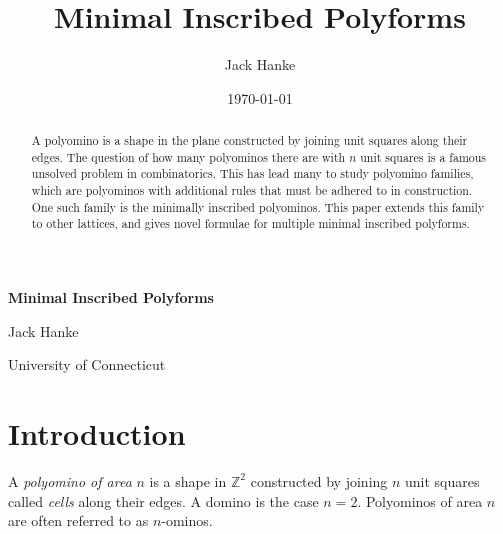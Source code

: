 \documentclass[12pt]{article}
\title{Minimal Inscribed Polyforms}
\author{Jack Hanke}
\date{\today}
\theoremstyle{plain}
\theoremstyle{definition}
\theoremstyle{remark}
\theoremstyle{definition}
\newcommand{\cell}[4]{\filldraw[gray!40] ( #1 , #2 ) rectangle ( #3 , #4 ); \draw[thick] ( #1 , #2 ) rectangle ( #3 , #4 );}
\begin{document}
\begin{center}
    \Large
    \textbf{Minimal Inscribed Polyforms}
    
    \vspace{0.4cm}
    \large
    Jack Hanke
    
    \vspace{0.4cm}
    \large
    University of Connecticut
    
    \vspace{0.4cm}
    
    \begin{abstract}
        A polyomino is a shape in the plane constructed by joining unit squares along their edges. The question of how many polyominos there are with $n$ unit squares is a famous unsolved problem in combinatorics. This has lead many to study polyomino families, which are polyominos with additional rules that must be adhered to in construction. One such family is the minimally inscribed polyominos. This paper extends this family to other lattices, and gives novel formulae for multiple minimal inscribed polyforms.
    \end{abstract}
    
\end{center}

\section{Introduction}

A \textit{polyomino of area} $n$ is a shape in $\mathbb{Z}^2$ constructed by joining $n$ unit squares called \textit{cells} along their edges. A domino is the case $n=2$. Polyominos of area $n$ are often referred to as $n$-ominos. 

\begin{center}
\end{center}
\end{document}

